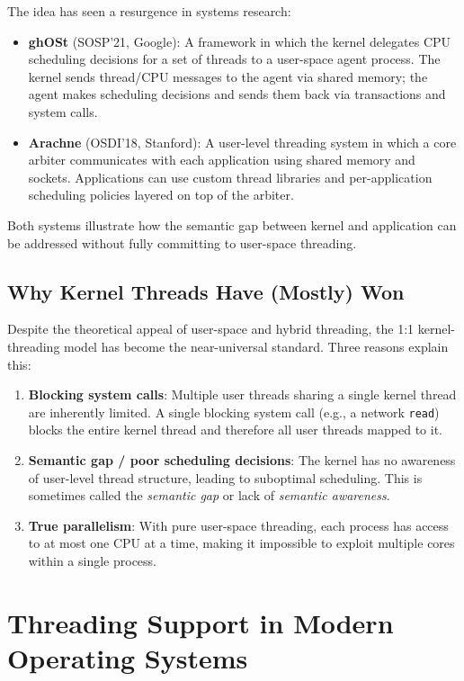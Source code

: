 \documentclass[11pt]{article}
\begin{document}
The idea has seen a resurgence in systems research:
\begin{itemize}
    \item \textbf{ghOSt} (SOSP'21, Google): A framework in which the kernel delegates CPU scheduling decisions for a set of threads to a user-space agent process. The kernel sends thread/CPU messages to the agent via shared memory; the agent makes scheduling decisions and sends them back via transactions and system calls.
    \item \textbf{Arachne} (OSDI'18, Stanford): A user-level threading system in which a core arbiter communicates with each application using shared memory and sockets. Applications can use custom thread libraries and per-application scheduling policies layered on top of the arbiter.
\end{itemize}

Both systems illustrate how the semantic gap between kernel and application can be addressed without fully committing to user-space threading.

\subsection{Why Kernel Threads Have (Mostly) Won}

Despite the theoretical appeal of user-space and hybrid threading, the 1:1 kernel-threading model has become the near-universal standard. Three reasons explain this:

\begin{enumerate}
    \item \textbf{Blocking system calls}: Multiple user threads sharing a single kernel thread are inherently limited. A single blocking system call (e.g., a network \texttt{read}) blocks the entire kernel thread and therefore all user threads mapped to it.
    \item \textbf{Semantic gap / poor scheduling decisions}: The kernel has no awareness of user-level thread structure, leading to suboptimal scheduling. This is sometimes called the \emph{semantic gap} or lack of \emph{semantic awareness}.
    \item \textbf{True parallelism}: With pure user-space threading, each process has access to at most one CPU at a time, making it impossible to exploit multiple cores within a single process.
\end{enumerate}

\section{Threading Support in Modern Operating Systems}
\end{document}
